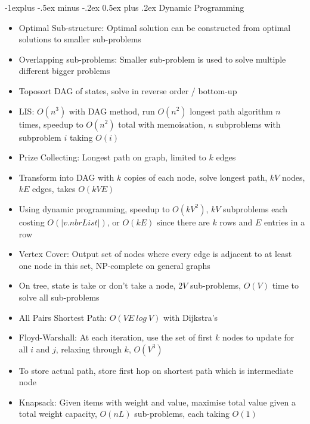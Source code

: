 \documentclass[10pt, landscape]{article}
\makeatletter
\renewcommand{\section}{\@startsection{section}{1}{0mm}%
                                {-1ex plus -.5ex minus -.2ex}%
                                {0.5ex plus .2ex}%
                                {\normalfont\large\bfseries}}
\renewcommand{\section}{\@startsection{section}{2}{0mm}%
                                {-1explus -.5ex minus -.2ex}%
                                {0.5ex plus .2ex}%
                                {\normalfont\normalsize\bfseries}}
\makeatother
\begin{document}
\begin{multicols*}{4}
\section{Dynamic Programming}
\begin{itemize}
    \item Optimal Sub-structure: Optimal solution can be constructed from optimal solutions to smaller sub-problems
    \item Overlapping sub-problems: Smaller sub-problem is used to solve multiple different bigger problems
    \item Toposort DAG of states, solve in reverse order / bottom-up
    \item LIS: $O(n^3)$ with DAG method, run $O(n^2)$ longest path algorithm $n$ times, speedup to $O(n^2)$ total with memoisation, $n$ subproblems with subproblem $i$ taking $O(i)$
    \item Prize Collecting: Longest path on graph, limited to $k$ edges
    \item Transform into DAG with $k$ copies of each node, solve longest path, $kV$ nodes, $kE$ edges, takes $O(kVE)$
    \item Using dynamic programming, speedup to $O(kV^2)$, $kV$ subproblems each costing $O(|v.nbrList|)$, or $O(kE)$ since there are $k$ rows and $E$ entries in a row
    \item Vertex Cover: Output set of nodes where every edge is adjacent to at least one node in this set, NP-complete on general graphs
    \item On tree, state is take or don't take a node, $2V$ sub-problems, $O(V)$ time to solve all sub-problems
    \item All Pairs Shortest Path: $O(VE\ log \ V)$ with Dijkstra's
    \item Floyd-Warshall: At each iteration, use the set of first $k$ nodes to update for all $i$ and $j$, relaxing through $k$, $O(V^3)$
    \item To store actual path, store first hop on shortest path which is intermediate node
    \item Knapsack: Given items with weight and value, maximise total value given a total weight capacity, $O(nL)$ sub-problems, each taking $O(1)$
\end{itemize}

\end{multicols*}
\end{document}
